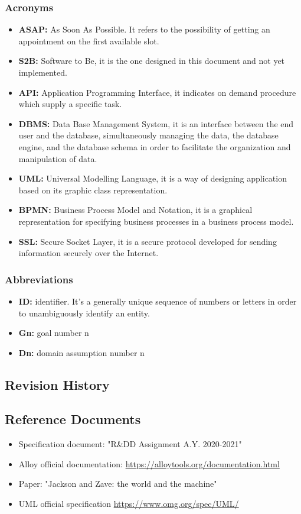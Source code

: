 \documentclass[table, 12pt]{article}
\begin{document}
\subsubsection{Acronyms}
\begin{itemize}
    \item {\textbf{ASAP:} As Soon As Possible. It refers to the possibility of getting an appointment on the first available slot.}
    \item {\textbf{S2B:} Software to Be, it is the one designed in this document and not yet implemented.}
    \item {\textbf{API:} Application Programming Interface, it indicates on demand procedure which supply a specific task.}
    \item \textbf{DBMS:} Data Base Management System, it is an interface between the end user and the database, simultaneously managing the data, the database engine, and the database schema in order to facilitate the organization and manipulation of data.
    \item {\textbf{UML:} Universal Modelling Language, it is a way of designing application based on its graphic class representation.}
    \item \textbf{BPMN:} Business Process Model and Notation, it is a graphical representation for specifying business processes in a business process model.
    \item \textbf{SSL:} Secure Socket Layer, it is a secure protocol developed for sending information securely over the Internet.
\end{itemize}
\subsubsection{Abbreviations}
\begin{itemize}
    \item {\textbf{ID:} identifier. It's a generally unique sequence of numbers or letters in order to unambiguously identify an entity.}
    \item {\textbf{Gn:} goal number n}
    \item \textbf{Dn:} domain assumption number n
\end{itemize}
\subsection{Revision History}
\subsection{Reference Documents}
\begin{itemize}
    \item {Specification document: "R\&DD Assignment A.Y. 2020-2021"}
    \item {Alloy official documentation: \href{https://alloytools.org/documentation.html}{https://alloytools.org/documentation.html}}
    \item {Paper: "Jackson and Zave: the world and the machine"}
    \item {UML official specification \href{https://www.omg.org/spec/UML/}{https://www.omg.org/spec/UML/}}
\end{itemize}
\end{document}
